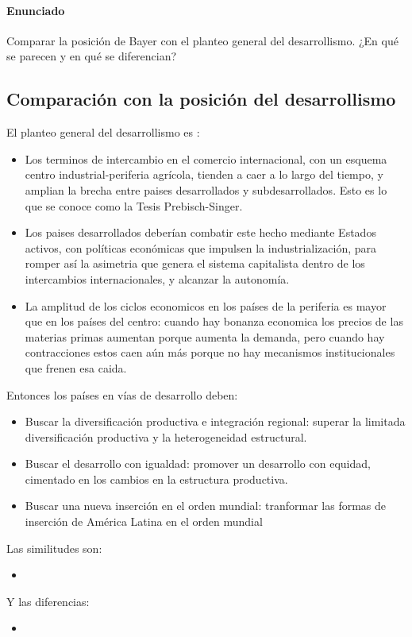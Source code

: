 \paragraph{Enunciado}
 Comparar la posición de Bayer con el planteo general del desarrollismo. ¿En qué se parecen y en qué se diferencian?

 \subsection*{Comparación con la posición del desarrollismo}

 El planteo general del desarrollismo es :
 \begin{itemize}
     \item Los terminos de intercambio en el comercio internacional, con un esquema centro industrial-periferia agrícola, tienden a caer a lo largo del tiempo,  y amplian la brecha entre paises desarrollados y subdesarrollados. Esto es lo que se conoce como la Tesis Prebisch-Singer.
     \item Los paises desarrollados deberían combatir este hecho mediante Estados activos, con políticas económicas que impulsen la industrialización, para romper así la asimetria que genera el sistema capitalista dentro de los intercambios internacionales, y alcanzar la autonomía.
    \item La amplitud de los ciclos economicos en los países de la periferia es mayor que en los países del centro: cuando hay bonanza economica los precios de las materias primas aumentan porque aumenta la demanda, pero cuando hay contracciones estos caen aún más porque no hay mecanismos institucionales que frenen esa caida.
 \end{itemize}

 Entonces los países en vías de desarrollo deben:

 \begin{itemize}
     \item Buscar la diversificación productiva e integración regional:  superar la limitada diversificación productiva y la heterogeneidad estructural.
     \item Buscar el desarrollo con igualdad: promover un desarrollo con equidad, cimentado en los cambios en la estructura productiva.
     \item Buscar una nueva inserción en el orden mundial: tranformar las formas de inserción de América Latina en el orden mundial
 \end{itemize}

 Las similitudes son:

 \begin{itemize}
     \item
 \end{itemize}

 Y las diferencias:

 \begin{itemize}
     \item
 \end{itemize}
